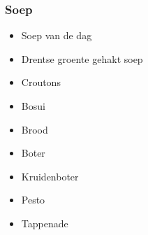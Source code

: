 \subsubsection*{Soep}
\begin{itemize}
	\item	Soep van de dag
	\item	Drentse groente gehakt soep
	\item	Croutons
	\item	Bosui
	\item	Brood
	\item	Boter
	\item	Kruidenboter
	\item	Pesto
	\item	Tappenade
\end{itemize}
